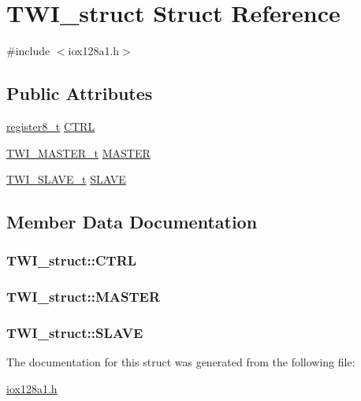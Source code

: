 \hypertarget{struct_t_w_i__struct}{
\section{TWI\_\-struct Struct Reference}
\label{struct_t_w_i__struct}
}


{\ttfamily \#include $<$iox128a1.h$>$}

\subsection*{Public Attributes}
\begin{DoxyCompactItemize}
\item 
\hyperlink{iox128a1_8h_a6a0649252b392263406882923b04a9db}{register8\_\-t} \hyperlink{struct_t_w_i__struct_a97d5e6e68d9c55b5c6b3bdf3ae229095}{CTRL}
\item 
\hyperlink{struct_t_w_i___m_a_s_t_e_r__struct}{TWI\_\-MASTER\_\-t} \hyperlink{struct_t_w_i__struct_a5f4a64a33745f397931aac2256b22976}{MASTER}
\item 
\hyperlink{struct_t_w_i___s_l_a_v_e__struct}{TWI\_\-SLAVE\_\-t} \hyperlink{struct_t_w_i__struct_a24154101496fef40a9893f856c16415b}{SLAVE}
\end{DoxyCompactItemize}


\subsection{Member Data Documentation}
\hypertarget{struct_t_w_i__struct_a97d5e6e68d9c55b5c6b3bdf3ae229095}{
\subsubsection[{CTRL}]{ {\bf TWI\_\-struct::CTRL}}}
\label{struct_t_w_i__struct_a97d5e6e68d9c55b5c6b3bdf3ae229095}
\hypertarget{struct_t_w_i__struct_a5f4a64a33745f397931aac2256b22976}{
\subsubsection[{MASTER}]{ {\bf TWI\_\-struct::MASTER}}}
\label{struct_t_w_i__struct_a5f4a64a33745f397931aac2256b22976}
\hypertarget{struct_t_w_i__struct_a24154101496fef40a9893f856c16415b}{
\subsubsection[{SLAVE}]{ {\bf TWI\_\-struct::SLAVE}}}
\label{struct_t_w_i__struct_a24154101496fef40a9893f856c16415b}


The documentation for this struct was generated from the following file:\begin{DoxyCompactItemize}
\item 
\hyperlink{iox128a1_8h}{iox128a1.h}\end{DoxyCompactItemize}
